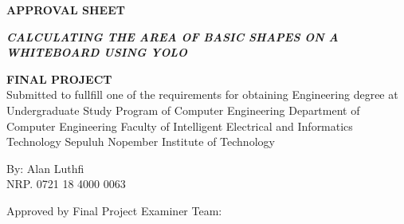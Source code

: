 \begin{center}
	\large
	\textbf{APPROVAL SHEET}
\end{center}

\thispagestyle{empty}

\begin{center}
	\textbf{\emph{CALCULATING THE AREA OF BASIC SHAPES ON A WHITEBOARD USING YOLO}}
\end{center}

\begingroup
\small


\begin{center}
	\textbf{FINAL PROJECT}
	\\Submitted to fullfill one of the requirements for obtaining Engineering degree at Undergraduate Study Program of Computer Engineering Department of Computer Engineering Faculty of Intelligent Electrical and Informatics Technology Sepuluh Nopember Institute of Technology
\end{center}


\begin{center}
	By: Alan Luthfi 
	\\NRP. 0721 18 4000 0063
\end{center}



\begin{center}
	Approved by Final Project Examiner Team:
\end{center}


\begingroup
\setlength{\tabcolsep}{0pt}

